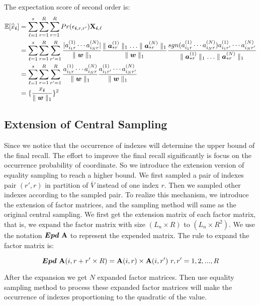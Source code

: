 \documentclass{article}
\newcommand{\Sca}[3]{{#1}^{(#2)}_{i_#2#3}}%
\newcommand{\V}[1]{{\bm{{\MakeLowercase{#1}}}}}
\newcommand{\Vacol}[1]{\V{a}^{(#1)}_{*r}}
\newcommand{\M}[1]{{\bm{\mathbf{\MakeUppercase{#1}}}}}
\newcommand{\norm}[2]{\parallel#1\parallel_{#2}}
\begin{document}
The expectation score of second order is:
\begin{align*}
\mathbb{E}[\widehat{x}_{\V{i}}]& =\sum_{\ell=1}^{s}\sum_{r=1}^{R}\sum_{r=1}^{R} Pr(\epsilon_{\V{i},r,r'})\M{X}_{\V{i},\ell}\\
& = \sum_{\ell=1}^{s}\sum_{r=1}^{R}\sum_{r'=1}^{R} \frac{|\Sca{a}{1}{r}\cdots\Sca{a}{N}{r}|}{\norm{\V{W}}{1}}
\frac{\norm{\Vacol{1}}{1}\ldots\norm{\Vacol{N}}{1}}{\norm{\V{W}}{1}}
\frac{sgn(\Sca{a}{1}{r}\cdots\Sca{a}{N}{r})\Sca{a}{1}{r'}\cdots\Sca{a}{N}{r'}}{ \norm{\Vacol{1}}{1}\ldots\norm{\Vacol{N}}{1}}\\
& = \sum_{\ell=1}^{s}\sum_{r=1}^{R}\sum_{r'=1}^{R} \frac{\Sca{a}{1}{r}\cdots\Sca{a}{N}{r}}{\norm{\V{W}}{1}}\frac{\Sca{a}{1}{r'}\cdots\Sca{a}{N}{r'}}{\norm{\V{W}}{1}}\\
& = \{\frac{x_{\V{i}}}{\norm{\V{w}}{1}}\}^2
\end{align*}



\subsection{Extension of Central Sampling}

Since we notice that the occurrence of indexes will determine the upper bound of the final recall. The effort to improve the final recall significantly is focus on the occurrence probability of coordinate. So we introduce the extension version of equality sampling to reach a higher bound. We first sampled a pair of indexes pair $(r',r)$ in partition of $\overline{V}$ instead of one index $r$. Then we sampled other indexes according to the sampled pair. To realize this mechanism, we introduce the extension of factor matrices, and the sampling method will same as the original central sampling. We first get the extension matrix of each factor matrix, that is, we expand the factor matrix with size $(L_n \times R)$ to $(L_n \times R^2)$. We use the notation $\bm{Epd}\ \M{A}$ to represent the expended matrix. The rule to expand the factor matrix is:

\[
\bm{Epd}\ \M{A}(i,r+r'\times R) = \M{A}(i,r)\times \M{A}(i,r')\  r,r' = {1,2,...,R}
\]

After the expansion we get $N$ expanded factor matrices. Then use equality sampling method to process these expanded factor matrices will make the occurrence of indexes proportioning to the quadratic of the value.
\end{document}
